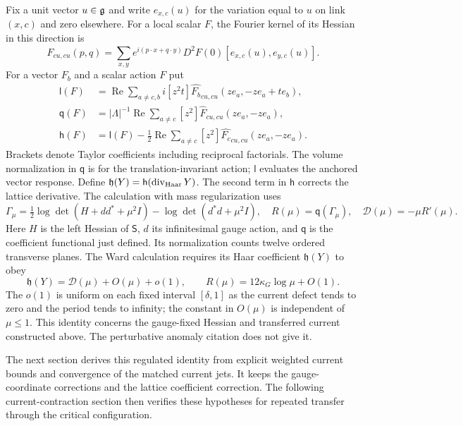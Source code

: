 Fix a unit vector $u\in\mathfrak g$ and write $e_{x,c}(u)$ for the variation
equal to $u$ on link $(x,c)$ and zero elsewhere. For a local scalar $F$,
the Fourier kernel of its Hessian in this direction is
\[
 \widehat F_{cu,cu}(p,q)=
 \sum_{x,y}e^{i(p\cdot x+q\cdot y)}
 D^2F(0)[e_{x,c}(u),e_{y,c}(u)].
\]
For a vector $F_b$ and a scalar action $F$ put
\begin{align*}
 \mathsf l(F)&=\operatorname{Re}\sum_{a\ne c,b}
      i[z^2t]\widehat{F_b}_{cu,cu}(ze_a,-ze_a+te_b),\\
 \mathsf q(F)&=|\Lambda|^{-1}\operatorname{Re}\sum_{a\ne c}
            [z^2]\widehat F_{cu,cu}(ze_a,-ze_a),\\
 \mathsf h(F)&=\mathsf l(F)-\tfrac12\operatorname{Re}\sum_{a\ne c}
            [z^2]\widehat{F_c}_{cu,cu}(ze_a,-ze_a).
\end{align*}
Brackets denote Taylor coefficients including reciprocal factorials.
The volume normalization in $\mathsf q$ is for the translation-invariant
action; $\mathsf l$ evaluates the anchored vector response. Define
$\mathfrak h(Y)=\mathsf h(\operatorname{div}_{\rm Haar}Y)$.
The second term in $\mathsf h$ corrects the lattice derivative.
The calculation with mass regularization uses
\[
 \Gamma_\mu=\tfrac12\log\det(H+dd^*+\mu^2I)
                 -\log\det(d^*d+\mu^2I),\quad
 R(\mu)=\mathsf q(\Gamma_\mu),\quad
 \mathcal D(\mu)=-\mu R'(\mu).
\]
Here $H$ is the left Hessian of $\mathsf S$, $d$ its infinitesimal
gauge action, and $\mathsf q$ is the coefficient functional just defined. Its normalization
counts twelve ordered transverse planes. The Ward calculation requires its Haar
coefficient $\mathfrak h(Y)$ to obey
\begin{equation}
 \mathfrak h(Y)=\mathcal D(\mu)+O(\mu)+o(1),\qquad
 R(\mu)=12\kappa_G\log\mu+O(1).
 \label{ch17:regulator-input}
\end{equation}
The $o(1)$ is uniform on each fixed interval $[\delta,1]$ as the
current defect tends to zero and the period tends to infinity;
the constant in $O(\mu)$ is independent of $\mu\le1$.
This identity concerns the gauge-fixed Hessian and transferred
current constructed above. The perturbative anomaly citation does not give it.

The next section derives this regulated identity from explicit weighted
current bounds and convergence of the matched current jets. It keeps
the gauge-coordinate corrections and the lattice coefficient correction.
The following current-contraction section then verifies these hypotheses
for repeated transfer through the critical configuration.

